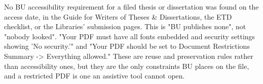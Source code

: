 
%

	{No BU accessibility requirement for a filed thesis or dissertation was found
	 on the access date, in the Guide for Writers of Theses \& Dissertations, the
	 ETD checklist, or the Libraries' submission pages. This is "BU publishes
	 none", not "nobody looked".}
	{"Your PDF must have all fonts embedded and security settings showing 'No
	 security.'" and "Your PDF should be set to Document Restrictions Summary ->
	 Everything allowed." These are reuse and preservation rules rather than
	 accessibility ones, but they are the only constraints BU places on the file,
	 and a restricted PDF is one an assistive tool cannot open.}


